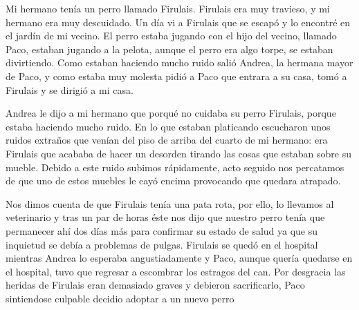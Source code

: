 \documentclass{article}
\begin{document}
Mi hermano tenía un perro llamado Firulais. Firulais era muy travieso, y mi hermano era muy descuidado. Un día vi a Firulais que se escapó y lo encontré en el jardín de mi vecino.
El perro estaba jugando con el hijo del vecino, llamado Paco, estaban jugando a la pelota, aunque el perro era algo torpe, se estaban divirtiendo. Como estaban haciendo mucho ruido salió Andrea, la hermana mayor de Paco, y como estaba muy molesta pidió a Paco que entrara a su casa, tomó a Firulais y se dirigió a mi casa.

Andrea le dijo a mi hermano que porqué no cuidaba su perro Firulais, porque estaba haciendo mucho ruido. En lo que estaban platicando escucharon unos ruidos extraños que venían del piso de arriba del cuarto de mi hermano: era Firulais que acababa de hacer un desorden tirando las cosas que estaban sobre su mueble. Debido a este ruido subimos rápidamente, acto seguido nos percatamos de que uno de estos muebles le cayó encima provocando que quedara atrapado.

Nos dimos cuenta de que Firulais tenía una pata rota, por ello, lo
llevamos al veterinario y tras un par de horas éste nos dijo que
nuestro perro tenía que permanecer ahí dos días más para confirmar su
estado de salud ya que su inquietud se debía a problemas de
pulgas. Firulais se quedó en el hospital mientras Andrea lo esperaba
angustiadamente y Paco, aunque quería quedarse en el hospital, tuvo
que regresar a escombrar los estragos del can. 
Por desgracia las heridas de Firulais eran demasiado graves y debieron  sacrificarlo, Paco sintiendose culpable decidio adoptar a un nuevo perro 
\end{document}

